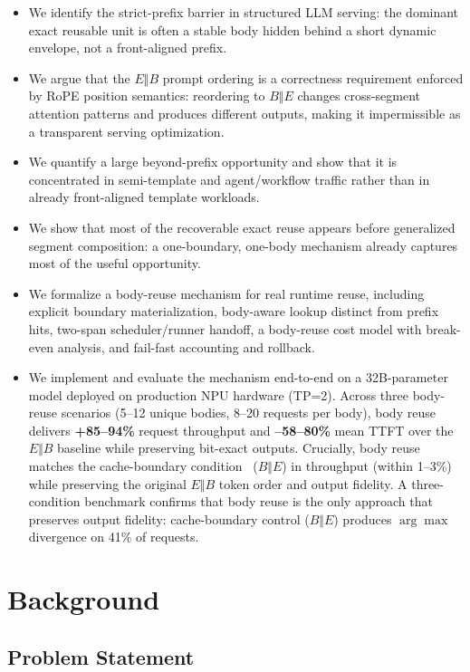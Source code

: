 \documentclass[conference]{IEEEtran}
\begin{document}
\begin{itemize}
\item We identify the strict-prefix barrier in structured LLM serving: the dominant exact reusable unit is often a stable body hidden behind a short dynamic envelope, not a front-aligned prefix.
\item We argue that the $E \Vert B$ prompt ordering is a correctness requirement enforced by RoPE position semantics: reordering to $B \Vert E$ changes cross-segment attention patterns and produces different outputs, making it impermissible as a transparent serving optimization.
\item We quantify a large beyond-prefix opportunity and show that it is concentrated in semi-template and agent/workflow traffic rather than in already front-aligned template workloads.
\item We show that most of the recoverable exact reuse appears before generalized segment composition: a one-boundary, one-body mechanism already captures most of the useful opportunity.
\item We formalize a body-reuse mechanism for real runtime reuse, including explicit boundary materialization, body-aware lookup distinct from prefix hits, two-span scheduler/runner handoff, a body-reuse cost model with break-even analysis, and fail-fast accounting and rollback.
\item We implement and evaluate the mechanism end-to-end on a 32B-parameter model deployed on production NPU hardware (TP=2). Across three body-reuse scenarios (5--12 unique bodies, 8--20 requests per body), body reuse delivers \textbf{+85--94\%} request throughput and \textbf{--58--80\%} mean TTFT over the $E \Vert B$ baseline while preserving bit-exact outputs. Crucially, body reuse matches the cache-boundary condition~\cite{lumer2026dontbreak} ($B \Vert E$) in throughput (within 1--3\%) while preserving the original $E \Vert B$ token order and output fidelity. A three-condition benchmark confirms that body reuse is the only approach that preserves output fidelity: cache-boundary control ($B \Vert E$) produces $\arg\max$ divergence on 41\% of requests.
\end{itemize}

\section{Background}

\subsection{Problem Statement}
\end{document}
